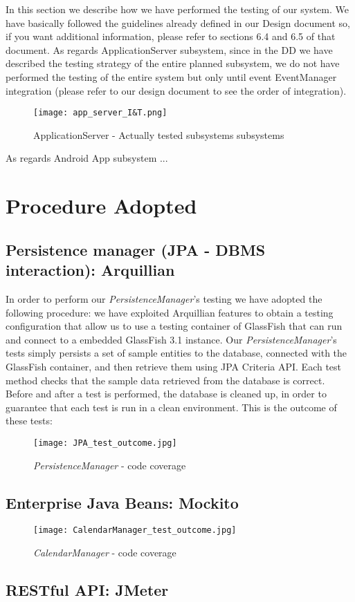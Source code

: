In this section we describe how we have performed the testing of our system.
We have basically followed the guidelines already defined in our Design document so, if you want additional information, please refer to sections 6.4 and 6.5 of that document.
As regards ApplicationServer subsystem, since in the DD we have described the testing strategy of the entire planned subsystem, we do not have performed the testing of the entire system but only until event EventManager integration (please refer to our design document to see the order of integration).\\
\begin{figure}[H]
	\begin{center}
		\hspace*{-40pt}
		\texttt{[image: app\_server\_I\&T.png]}
	\end{center}
\caption{ ApplicationServer - Actually tested subsystems subsystems}
\end{figure}
As regards Android App subsystem ...

\section{Procedure Adopted}
\subsection{Persistence manager (JPA - DBMS interaction): Arquillian}
In order to perform our \textit{PersistenceManager}'s testing we have adopted the following procedure: we have exploited Arquillian features to obtain a testing configuration that allow us to use a testing container of GlassFish that can run and connect to a embedded GlassFish 3.1 instance.
Our \textit{PersistenceManager}'s tests simply  persists a set of sample entities to the database, connected with the GlassFish container, and then retrieve them using JPA Criteria API.
Each test method checks that the sample data retrieved from the database is correct.  Before and after a test is performed, the database is cleaned up, in order to guarantee that each test is run in a clean environment.
This is the outcome of these tests:
\begin{figure}[H]
	\begin{center}
		\texttt{[image: JPA\_test\_outcome.jpg]}
	\end{center}
\caption{ \textit{PersistenceManager} - code coverage}
\end{figure}

\subsection{Enterprise Java Beans: Mockito}
\begin{figure}[H]
	\begin{center}
		\texttt{[image: CalendarManager\_test\_outcome.jpg]}
	\end{center}
\caption{ \textit{CalendarManager} - code coverage}
\end{figure}

\subsection{RESTful API: JMeter}



